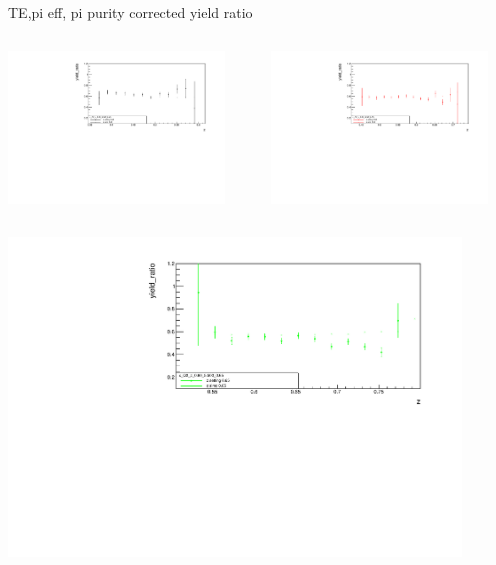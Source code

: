 \begin{frame}{TE,pi eff, pi purity corrected yield ratio}
\begin{columns}
\begin{column}[T]{0.5\textwidth}
\includegraphics[width = 0.9\textwidth]{results/yield/statistics_corr/x_Q2_z_60_5500_45_ratio.pdf}
\end{column}
\begin{column}[T]{0.5\textwidth}
\includegraphics[width = 0.9\textwidth]{results/yield/statistics_corr/x_Q2_z_60_5500_55_ratio.pdf}
\end{column}
\end{columns}
\begin{columns}
\begin{column}[T]{0.5\textwidth}
\includegraphics[width = 0.9\textwidth]{results/yield/statistics_corr/x_Q2_z_60_5500_65_ratio.pdf}

\end{column}
\end{columns}
\end{frame}
